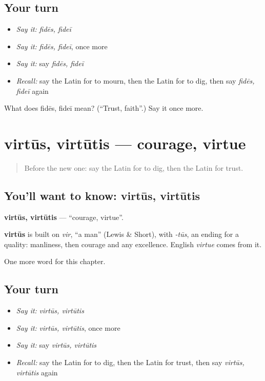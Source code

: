 \subsection*{Your turn}
\begin{itemize}
\raggedright
  \item \emph{Say it:} \emph{fidēs, fideī}
  \item \emph{Say it:} \emph{fidēs, fideī}, once more
  \item \emph{Say it:} say \emph{fidēs, fideī}
  \item \emph{Recall:} say the Latin for to mourn, then the Latin for to dig, then say \emph{fidēs, fideī} again
\end{itemize}

\begin{tcolorbox}[breakable,colback=teal!4,colframe=teal!35!black,title={Before you move on}]
What does fidēs, fideī mean? (\textquotedblleft{}Trust, faith\textquotedblright{}.) Say it once more.
\end{tcolorbox}
\section[virtūs, virtūtis]{virtūs, virtūtis — courage, virtue}

\label{lesson:LA-C262-virtus}



\begin{quote}
Before the new one: say the Latin for to dig, then the Latin for trust.
\end{quote}

\subsection*{You'll want to know: virtūs, virtūtis}
\textbf{virtūs, virtūtis} — \textquotedblleft{}courage, virtue\textquotedblright{}.

\begin{cousinweb}
\textbf{virtūs} is built on \emph{vir}, \textquotedblleft{}a man\textquotedblright{} (Lewis \& Short), with \emph{-tūs}, an ending for a quality: manliness, then courage and any excellence. English \emph{virtue} comes from it.
\end{cousinweb}

\begin{grammarlens}[title={What you've built}]
One more word for this chapter.
\end{grammarlens}

\subsection*{Your turn}
\begin{itemize}
\raggedright
  \item \emph{Say it:} \emph{virtūs, virtūtis}
  \item \emph{Say it:} \emph{virtūs, virtūtis}, once more
  \item \emph{Say it:} say \emph{virtūs, virtūtis}
  \item \emph{Recall:} say the Latin for to dig, then the Latin for trust, then say \emph{virtūs, virtūtis} again
\end{itemize}

